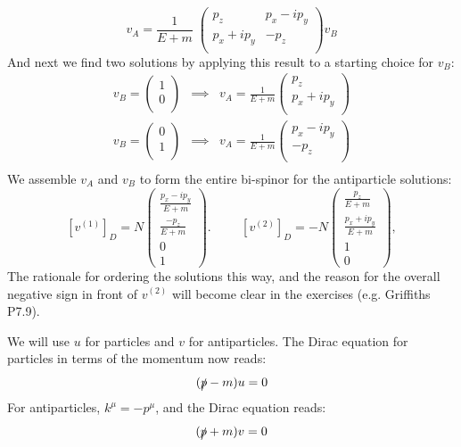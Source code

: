 \documentclass[12pt]{article}
\begin{document}
$$v_A = \frac{1}{E+m} \; \begin{pmatrix} p_z & p_x - i p_y \\ p_x + i p_y & -p_z \\ \end{pmatrix} v_B
$$
And next we find two solutions by applying this result to a starting choice for $v_B$:
\begin{eqnarray*}
v_B = \begin{pmatrix} 1 \\ 0 \\ \end{pmatrix} &\implies&
v_A = \frac{1}{E+m} \begin{pmatrix} p_z \\ p_x + i p_y \\ \end{pmatrix}\\
v_B = \begin{pmatrix} 0 \\ 1 \\ \end{pmatrix} &\implies&
v_A = \frac{1}{E+m} \begin{pmatrix} p_x - i p_y \\ -p_z \\ \end{pmatrix}\\
\end{eqnarray*}
We assemble $v_A$ and $v_B$ to form the entire bi-spinor for the antiparticle solutions:
$$
[v^{(1)}]_D = N \begin{pmatrix} \frac{p_x - i p_y}{E+m} \\ \frac{-p_z}{E+m} \\ 0 \\ 1\end{pmatrix}.
\hspace{1cm}
[v^{(2)}]_D = -N \begin{pmatrix} \frac{p_z}{E+m} \\[5pt] \frac{p_x + i p_y}{E + m} \\ 1 \\ 0\end{pmatrix},
$$
The rationale for ordering the solutions this way, and the reason for the overall negative sign in front of $v^{(2)}$ will become clear in the exercises (e.g. Griffiths P7.9).

We will use $u$ for particles and $v$ for antiparticles.  The Dirac equation for particles in terms of the momentum now reads:
$$(\slashed{p}-m) u = 0$$
For antiparticles, $k^\mu = -p^\mu$, and the Dirac equation reads:
$$(\slashed{p}+m) v = 0$$
\end{document}
